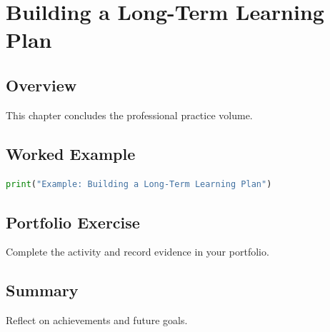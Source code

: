 \chapter{Building a Long-Term Learning Plan}
\label{chap:vol15-9}



\section{Overview}
This chapter concludes the professional practice volume.

\section{Worked Example}
\begin{lstlisting}[language=Python]
print("Example: Building a Long-Term Learning Plan")
\end{lstlisting}

\section{Portfolio Exercise}
Complete the activity and record evidence in your portfolio.

\section{Summary}
Reflect on achievements and future goals.
